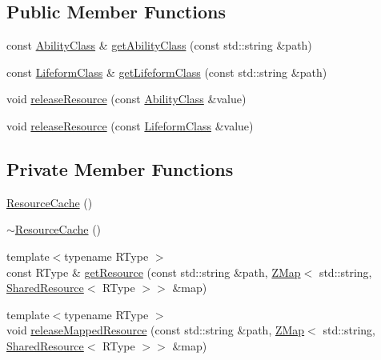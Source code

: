 \subsection*{Public Member Functions}
\begin{DoxyCompactItemize}
\item 
const \hyperlink{classZeta_1_1AbilityClass}{Ability\+Class} \& \hyperlink{classZeta_1_1ResourceCache_a8e54f7bee7fc228735130fef21f7c160}{get\+Ability\+Class} (const std\+::string \&path)
\item 
const \hyperlink{classZeta_1_1LifeformClass}{Lifeform\+Class} \& \hyperlink{classZeta_1_1ResourceCache_a06d59ea554c45515e3f571698d6e32f3}{get\+Lifeform\+Class} (const std\+::string \&path)
\item 
void \hyperlink{classZeta_1_1ResourceCache_af2e2b3b906f55a2312f6a53d8b096a5c}{release\+Resource} (const \hyperlink{classZeta_1_1AbilityClass}{Ability\+Class} \&value)
\item 
void \hyperlink{classZeta_1_1ResourceCache_a85381642c92fd8f4c624709893f72ce0}{release\+Resource} (const \hyperlink{classZeta_1_1LifeformClass}{Lifeform\+Class} \&value)
\end{DoxyCompactItemize}
\subsection*{Private Member Functions}
\begin{DoxyCompactItemize}
\item 
\hyperlink{classZeta_1_1ResourceCache_a2441f22f60cf12b6683c43bda3a60401}{Resource\+Cache} ()
\item 
\hyperlink{classZeta_1_1ResourceCache_a0d1dffd1e8862f0a0c9fb28d45b30955}{$\sim$\+Resource\+Cache} ()
\item 
{\footnotesize template$<$typename R\+Type $>$ }\\const R\+Type \& \hyperlink{classZeta_1_1ResourceCache_ae1bfc8155fa59c6315dced944253a3e9}{get\+Resource} (const std\+::string \&path, \hyperlink{namespaceZeta_a9af2e12c4e432d2a1725f19e5a648a04}{Z\+Map}$<$ std\+::string, \hyperlink{classZeta_1_1SharedResource}{Shared\+Resource}$<$ R\+Type $>$$>$ \&map)
\item 
{\footnotesize template$<$typename R\+Type $>$ }\\void \hyperlink{classZeta_1_1ResourceCache_ae23468ce4f59a689353542ec52bae9d5}{release\+Mapped\+Resource} (const std\+::string \&path, \hyperlink{namespaceZeta_a9af2e12c4e432d2a1725f19e5a648a04}{Z\+Map}$<$ std\+::string, \hyperlink{classZeta_1_1SharedResource}{Shared\+Resource}$<$ R\+Type $>$$>$ \&map)
\end{DoxyCompactItemize}
